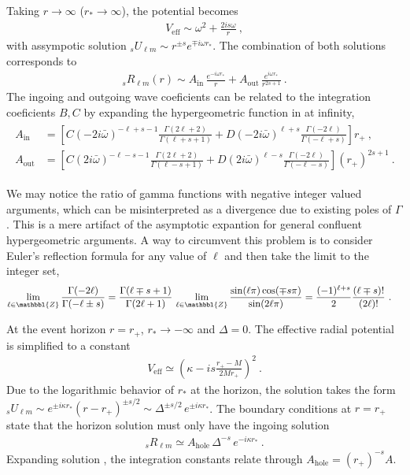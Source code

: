 Taking $r\to\infty$ ($r_{*}\to\infty$), the potential becomes
\begin{align}
    \label{eq3:asymptoticVeff}
    V_\mathrm{eff} \sim \omega^2 + \frac{2 i s \omega}{r} ~,
\end{align}
with assympotic solution ${}_{s}U_{\ell m}\sim r^{\pm s} e^{\mp i \omega r_{*}}$.
The combination of both solutions corresponds to
\begin{align}
    {}_{s}R_{\ell m}(r) \sim A_\mathrm{in}\, \frac{e^{-i \omega r_*}}{r} + A_\mathrm{out}\, \frac{e^{i \omega r_*}}{r^{2s+1}} ~.
    \label{eq3:asymptoticR}
\end{align}
The ingoing and outgoing wave coeficients can be related to the integration coeficients $B, C$ by expanding the hypergeometric function in  at infinity,
\begin{align}
    \begin{split}
    A_\mathrm{in} &= \left[ C (-2 i \bar{\omega})^{-\ell+s-1} \frac{\Gamma(2\ell+2)}{\Gamma(\ell+s+1)} + D (-2 i \bar{\omega})^{\ell+s} \frac{\Gamma(-2\ell)}{\Gamma(-\ell+s)} \right] r_{+} ~, \\
    A_\mathrm{out} &= \left[ C (2 i \bar{\omega})^{-\ell-s-1} \frac{\Gamma(2\ell+2)}{\Gamma(\ell-s+1)} + D (2 i \bar{\omega})^{\ell-s} \frac{\Gamma(-2\ell)}{\Gamma(-\ell-s)} \right] (r_{+})^{2s+1}  ~.
    \end{split}
\end{align}

We may notice the ratio of gamma functions with negative integer valued arguments, which can be misinterpreted as a divergence due to existing poles of $\Gamma$.
This is a mere artifact of the asymptotic expantion for general confluent hypergeometric arguments.
A way to circumvent this problem is to consider Euler's reflection formula for any value of $\ell$ and then take the limit to the integer set,
\begin{align}
    \label{eq3:negativeGammaRatio}
    \lim_{\ell\in\mathbbl{Z}} \frac{\Gamma(-2\ell)}{\Gamma(-\ell\pm s)} &= \frac{\Gamma(\ell\mp s+1)}{\Gamma(2\ell+1)} \, \lim_{\ell\in\mathbbl{Z}} \frac{\sin(\ell\pi)\cos(\mp s \pi)}{\sin(2\ell\pi)} = \frac{(-1)^{\ell+s}}{2} \frac{(\ell \mp s)!}{(2\ell)!} ~.
\end{align}
 
At the event horizon $r=r_+$, $r_*\to-\infty$ and $\Delta=0$.
The effective radial potential is simplified to a constant
\begin{align}
    V_\mathrm{eff} \simeq \left( \kappa- i s \frac{r_+ - M}{2 M r_+} \right)^2 ~.
\end{align}
Due to the logarithmic behavior of $r_*$ at the horizon, the solution takes the form ${}_{s}U_{\ell m}\sim e^{\pm i \kappa r_{*} } (r-r_{+})^{\pm s/2} \sim \Delta^{\pm s/2} \,e^{\pm i \kappa r_{*} }$. The boundary conditions at $r=r_{+}$ state that the horizon solution must only have the ingoing solution
\begin{align}
    \label{eq3:boundaryR}
    {}_{s}R_{\ell m} \simeq A_\mathrm{hole} \,\Delta^{-s} \,e^{- i \kappa r_{*} } ~.
\end{align}
Expanding solution , the integration constants relate through $A_\mathrm{hole} = (r_{+})^{-s} A$.

